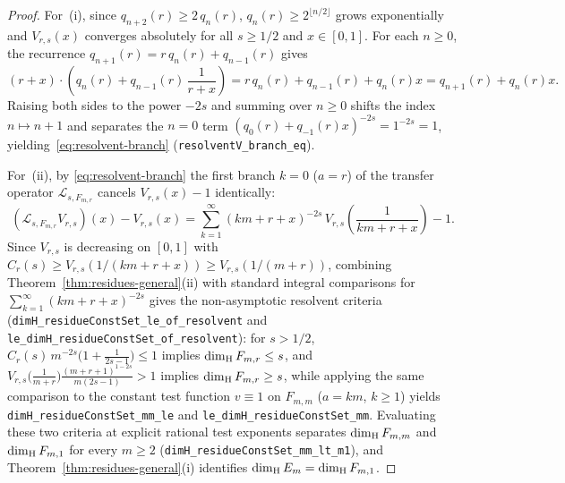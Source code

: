 \begin{proof}
For~(i), since $q_{n+2}(r)\ge 2\,q_n(r)$, $q_n(r)\ge 2^{\lfloor n/2\rfloor}$ grows
exponentially and $V_{r,s}(x)$ converges absolutely for all $s\ge1/2$ and $x\in[0,1]$.
For each $n\ge0$, the recurrence $q_{n+1}(r)=r\,q_n(r)+q_{n-1}(r)$ gives
\[
(r+x)\cdot\left(q_n(r)+q_{n-1}(r)\,\frac{1}{r+x}\right)
=r\,q_n(r)+q_{n-1}(r)+q_n(r)x
=q_{n+1}(r)+q_n(r)x.
\]
Raising both sides to the power $-2s$ and summing over $n\ge0$ shifts the index
$n\mapsto n+1$ and separates the $n=0$ term $(q_0(r)+q_{-1}(r)x)^{-2s}=1^{-2s}=1$,
yielding~\eqref{eq:resolvent-branch} (\texttt{resolventV\_\allowbreak branch\_\allowbreak eq}).

For~(ii), by \eqref{eq:resolvent-branch} the first branch $k=0$ ($a=r$) of the
transfer operator $\mathcal L_{s,F_{m,r}}$ cancels $V_{r,s}(x)-1$ identically:
\[
(\mathcal L_{s,F_{m,r}}V_{r,s})(x)-V_{r,s}(x)
=\sum_{k=1}^\infty(km+r+x)^{-2s}\,V_{r,s}\!\left(\frac{1}{km+r+x}\right)-1.
\]
Since $V_{r,s}$ is decreasing on $[0,1]$ with $C_r(s)\ge V_{r,s}(1/(km+r+x))\ge V_{r,s}(1/(m+r))$,
combining Theorem~\ref{thm:residues-general}(ii) with standard integral comparisons for
$\sum_{k=1}^\infty(km+r+x)^{-2s}$ gives the non-asymptotic resolvent criteria
(\texttt{dimH\_\allowbreak residueConstSet\_\allowbreak le\_\allowbreak of\_\allowbreak resolvent}
and \texttt{le\_\allowbreak dimH\_\allowbreak residueConstSet\_\allowbreak of\_\allowbreak resolvent}):
for $s>1/2$, $C_r(s)\,m^{-2s}\bigl(1+\frac{1}{2s-1}\bigr)\le 1$ implies $\dim_{\mathrm{H}} F_{m,r}\le s$,
and $V_{r,s}\bigl(\frac{1}{m+r}\bigr)\frac{(m+r+1)^{1-2s}}{m(2s-1)}>1$ implies $\dim_{\mathrm{H}} F_{m,r}\ge s$,
while applying the same comparison to the constant test function $v\equiv 1$ on
$F_{m,m}$ ($a=km$, $k\ge1$) yields \texttt{dimH\_\allowbreak residueConstSet\_\allowbreak mm\_\allowbreak le}
and \texttt{le\_\allowbreak dimH\_\allowbreak residueConstSet\_\allowbreak mm}.
Evaluating these two criteria at explicit rational test exponents separates
$\dim_{\mathrm{H}} F_{m,m}$ and $\dim_{\mathrm{H}} F_{m,1}$ for every $m\ge2$
(\texttt{dimH\_\allowbreak residueConstSet\_\allowbreak mm\_\allowbreak lt\_\allowbreak m1}),
and Theorem~\ref{thm:residues-general}(i) identifies $\dim_{\mathrm{H}} E_m=\dim_{\mathrm{H}} F_{m,1}$.


\end{proof}
